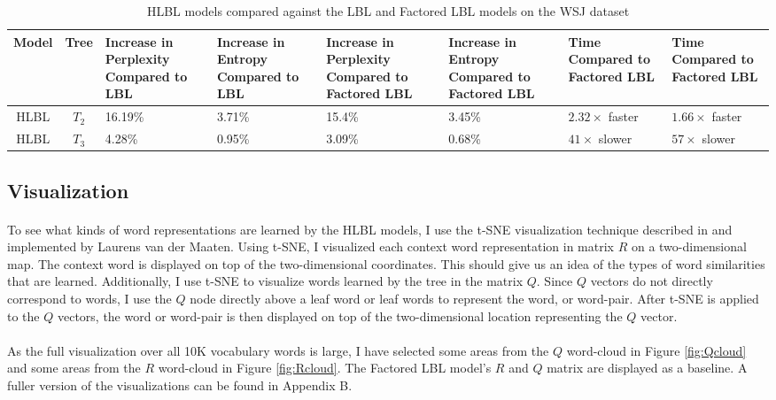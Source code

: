 \begin{table*} \centering
{}
\begin{tabular}{@{}ccC{1.75cm}C{1.75cm}C{1.75cm}C{1.75cm}C{1.75cm}C{1.75cm}@{}}\toprule
Model & Tree
& Increase in Perplexity Compared to LBL & Increase in Entropy Compared to LBL
& Increase in Perplexity Compared to Factored LBL & Increase in Entropy Compared to Factored LBL
& Time Compared to Factored LBL & Time Compared to Factored LBL
\\
\midrule
 HLBL & $T_2$ & 16.19\% & 3.71\% & 15.4\% & 3.45\% & $2.32\times$ faster & $1.66\times$ faster\\
 HLBL & $T_3$ & 4.28\% & 0.95\% & 3.09\% & 0.68\% &$41\times$ slower & $57\times$ slower\\
\bottomrule
\end{tabular}
\caption{HLBL models compared against the LBL and Factored LBL models on the WSJ dataset}
\label{tab:perplexityAndSpeedup}
\end{table*}


\subsection{Visualization} \label{sec:tsne}
\paragraph{}
To see what kinds of word representations are learned by the HLBL models, I use the t-SNE visualization technique described in \cite{Maaten2008} and implemented by Laurens van der Maaten. Using t-SNE, I visualized each context word representation in matrix $R$ on a two-dimensional map. The context word is displayed on top of the two-dimensional coordinates. This should give us an idea of the types of word similarities that are learned. Additionally, I use t-SNE to visualize words learned by the tree in the matrix $Q$. Since $Q$ vectors do not directly correspond to words, I use the $Q$ node directly above a leaf word or leaf words to represent the word, or word-pair. After t-SNE is applied to the $Q$ vectors, the word or word-pair is then displayed on top of the two-dimensional location representing the $Q$ vector.
\paragraph{}
As the full visualization over all 10K vocabulary words is large, I have selected some areas from the $Q$ word-cloud in Figure \ref{fig:Qcloud} and some areas from the $R$ word-cloud in Figure \ref{fig:Rcloud}. The Factored LBL model's $R$ and $Q$ matrix are displayed as a baseline. A fuller version of the visualizations can be found in Appendix B. 
